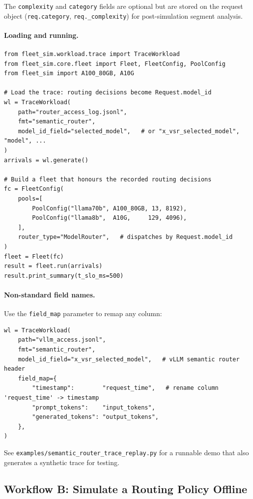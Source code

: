 \documentclass[11pt,a4paper]{article}
\begin{document}
The \texttt{complexity} and \texttt{category} fields are optional but are
stored on the request object (\texttt{req.category},
\texttt{req.\_complexity}) for post-simulation segment analysis.

\paragraph{Loading and running.}

\begin{lstlisting}[style=python]
from fleet_sim.workload.trace import TraceWorkload
from fleet_sim.core.fleet import Fleet, FleetConfig, PoolConfig
from fleet_sim import A100_80GB, A10G

# Load the trace: routing decisions become Request.model_id
wl = TraceWorkload(
    path="router_access_log.jsonl",
    fmt="semantic_router",
    model_id_field="selected_model",   # or "x_vsr_selected_model", "model", ...
)
arrivals = wl.generate()

# Build a fleet that honours the recorded routing decisions
fc = FleetConfig(
    pools=[
        PoolConfig("llama70b", A100_80GB, 13, 8192),
        PoolConfig("llama8b",  A10G,     129, 4096),
    ],
    router_type="ModelRouter",   # dispatches by Request.model_id
)
fleet = Fleet(fc)
result = fleet.run(arrivals)
result.print_summary(t_slo_ms=500)
\end{lstlisting}

\paragraph{Non-standard field names.}
Use the \texttt{field\_map} parameter to remap any column:

\begin{lstlisting}[style=python]
wl = TraceWorkload(
    path="vllm_access.jsonl",
    fmt="semantic_router",
    model_id_field="x_vsr_selected_model",   # vLLM semantic router header
    field_map={
        "timestamp":        "request_time",   # rename column 'request_time' -> timestamp
        "prompt_tokens":    "input_tokens",
        "generated_tokens": "output_tokens",
    },
)
\end{lstlisting}

See \texttt{examples/semantic\_router\_trace\_replay.py} for a runnable
demo that also generates a synthetic trace for testing.

\subsection{Workflow B: Simulate a Routing Policy Offline}
\label{sec:semantic-offline}
\end{document}
